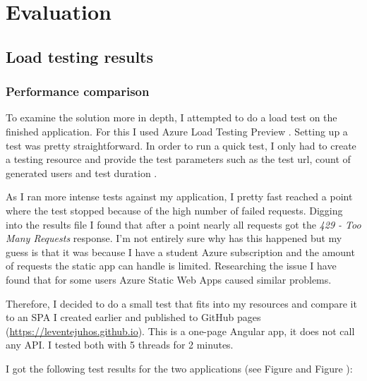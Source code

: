 \chapter{Evaluation}\label{sect:Comparison}\label{Ch6}
\section{Load testing results}
\subsection{Performance comparison}
To examine the solution more in depth, I attempted to do a load test on the finished application. For this I used Azure Load Testing Preview \cite{LoadtestOverview}. Setting up a test was pretty straightforward. In order to run a quick test, I only had to create a testing resource and provide the test parameters such as the test url, count of generated users and test duration \cite{LoadtestQuickstart}. 

As I ran more intense tests against my application, I pretty fast reached a point where the test stopped because of the high number of failed requests. Digging into the results file I found that after a point nearly all requests got the \emph{429 - Too Many Requests} response. I'm not entirely sure why has this happened but my guess is that it was because I have a student Azure subscription and the amount of requests the static app can handle is limited. Researching the issue I have found that for some users Azure Static Web Apps caused similar problems.

Therefore, I decided to do a small test that fits into my resources and compare it to an SPA I created earlier and published to GitHub pages (\url{https://leventejuhos.github.io}). This is a one-page Angular app, it does not call any API. I tested both with 5 threads for 2 minutes.

I got the following test results for the two applications (see Figure  and Figure ):

